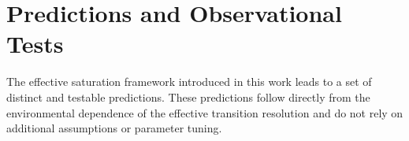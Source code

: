 \section{Predictions and Observational Tests}
  \label{sec:predictions}

  The effective saturation framework introduced in this work leads to a set of
  distinct and testable predictions.
  These predictions follow directly from the environmental dependence of the
  effective transition resolution and do not rely on additional assumptions or
  parameter tuning.

  
  
  
  
  
  
  
  
  
